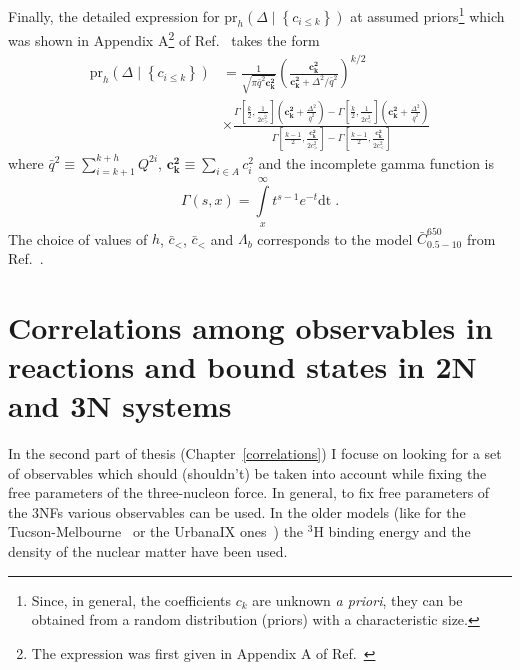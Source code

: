 Finally, the detailed expression for $\text{pr}_{h}\left(\Delta\mid \left\lbrace c_{i \leq k} \right\rbrace \right)$ at assumed priors\footnote{Since, in general, the coefficients $c_{k}$ are unknown \textit{a priori}, they can be obtained from a random distribution (priors) with a characteristic size.} which was shown in Appendix A\footnote{The expression was first given in Appendix A of Ref.~\cite{melendez2017bayesian}} of Ref.~\cite{epelbaum2020towards} takes the form
\begin{equation}
\begin{split}
\text{pr}_{h}\left(\Delta\mid \left\lbrace c_{i \leq k} \right\rbrace \right) &= \frac{1}{\sqrt{\pi \bar{q}^2 \boldsymbol{c_{k}^2}}} \left(\frac{\boldsymbol{c_{k}^2}}{\boldsymbol{c_{k}^2} + \Delta^{2}/\bar{q}^2}\right)^{k/2}\\
&\times \frac{\Gamma\left[\frac{k}{2},\frac{1}{2\bar{c^{2}_{>}}}\right]\left(\boldsymbol{c^{2}_{k}} + \frac{\Delta^{2}}{\bar{q}^2} \right) - \Gamma\left[\frac{k}{2},\frac{1}{2\bar{c^{2}_{<}}}\right]\left(\boldsymbol{c^{2}_{k}} + \frac{\Delta^{2}}{\bar{q}^2} \right)}{\Gamma\left[\frac{k - 1}{2}, \frac{\boldsymbol{c^{2}_{k}}}{2\bar{c^{2}_{>}}} \right] - \Gamma\left[\frac{k - 1}{2}, \frac{\boldsymbol{c^{2}_{k}}}{2\bar{c^{2}_{<}}} \right]}
\end{split}
\label{eq_posterior4}
\end{equation}
where $\bar{q}^{2} \equiv \sum\limits^{k + h}_{i = k + 1} Q^{2i}$, $\boldsymbol{c^{2}_{k}} \equiv \sum_{i \in A} c^{2}_{i}$ and the incomplete gamma function is
\begin{equation}
\Gamma (s, x) = \int\limits_{x}^{\infty} t^{s-1}e^{-t}\mathrm{dt}\;.
\end{equation}
The choice of values of $h$, $\bar{c}_{<}$, $\bar{c}_{<}$ and $\Lambda_{b}$ corresponds to the model
$\bar{C}^{650}_{0.5-10}$ from Ref.~\cite{epelbaum2020towards}.

\section{Correlations among observables in reactions and bound states in 2N and 3N systems}
In the second part of thesis (Chapter~\ref{correlations}) I focuse on looking for a set of observables which should (shouldn't) be taken into account while fixing the free parameters of the three-nucleon force. In general, to fix free parameters of the 3NFs various observables can be used. In the older models (like for the Tucson-Melbourne~\cite{coon1979two, coon1981two, coon2001reworking} or the UrbanaIX ones~\cite{pudliner1997quantum}) the $^{3}$H binding energy and the density of the nuclear matter have been used. 

